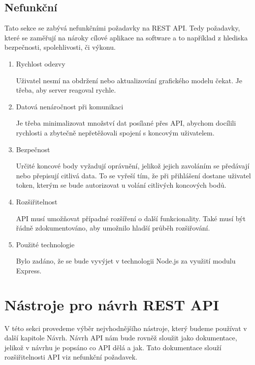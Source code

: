 \documentclass[thesis=B,czech]{FITthesis}[2012/06/26]
\begin{document}
        \subsection{Nefunkční}
            Tato sekce se zabývá nefunkčními požadavky na REST API. Tedy požadavky, které se zaměřují na nároky cílové aplikace na software a to například z hlediska bezpečnosti, spolehlivosti, či výkonu.
            \begin{enumerate}
                \item Rychlost odezvy

                    Uživatel nesmí na obdržení nebo aktualizování grafického modelu čekat. Je třeba, aby server reagoval rychle.
                \item Datová nenáročnost při komunikaci

                    Je třeba minimalizovat množství dat posílané přes API, abychom docílili rychlosti a zbytečně nepřetěžovali spojení s koncovým uživatelem.
                \item Bezpečnost
                    
                    Určité koncové body vyžadují oprávnění, jelikož jejich zavoláním se předávají nebo přepisují citlivá data. To se vyřeší tím, že při přihlášení dostane uživatel token, kterým se bude autorizovat u volání citlivých koncových bodů.
                \item Rozšiřitelnost

                    API musí umožňovat případné rozšíření o další funkcionality. Také musí být řádně zdokumentováno, aby umožnilo hladší průběh rozšiřování.
                \item Použité technologie

                    Bylo zadáno, že se bude vyvýjet v technologii Node.js za využití modulu Express.
            \end{enumerate}
    \section{Nástroje pro návrh REST API}
        V této sekci provedeme výběr nejvhodnějšího nástroje, který budeme používat v další kapitole Návrh.
        Návrh API nám bude rovněž sloužit jako dokumentace, jelikož v návrhu je popsáno co API dělá a jak. Tato dokumentace slouží rozšiřitelnosti API viz nefunkční požadavek.
        
\end{document}
